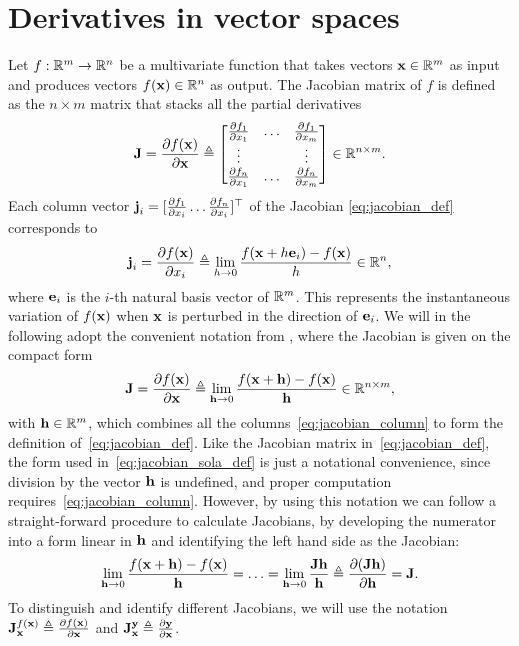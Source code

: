 \section{Derivatives in vector spaces}
Let $f: \bbR^m \to \bbR^n$ be a multivariate function that takes vectors $\vecx \in \bbR^m$ as input and produces vectors $f(\vecx) \in \bbR^n$ as output.
The Jacobian matrix of $f$ is defined as the $n \times m$ matrix that stacks all the partial derivatives
%
\begin{equation} \label{eq:jacobian_def}
  \matJ = \dpar{f(\vecx)}{\vecx} \triangleq
  \begin{bmatrix}
    \dpar{f_1}{x_1} & \hdots & \dpar{f_1}{x_m}\\
    \vdots & & \vdots\\
    \dpar{f_n}{x_1} & \hdots & \dpar{f_n}{x_m}
  \end{bmatrix}
  \in \bbR^{n \times m}.
\end{equation}
%
Each column vector $\vecj_i = [\dpar{f_1}{x_i} \hdots \dpar{f_n}{x_i}]\trans$ of the Jacobian \eqref{eq:jacobian_def} corresponds to
%
\begin{equation} \label{eq:jacobian_column}
  \vecj_i = \dpar{f(\vecx)}{x_i} \triangleq \lim_{h \to 0} \frac{f(\vecx + h \vece_i) - f(\vecx)}{h} \in \bbR^n,
\end{equation}
%
where $\vece_i$ is the $i$-th natural basis vector of $\bbR^m$.
This represents the instantaneous variation of $f(\vecx)$ when $\vecx$ is perturbed in the direction of $\vece_i$.
We will in the following adopt the convenient notation from \cite{SolaARobotics}, where the Jacobian is given on the compact form
%
\begin{equation}  \label{eq:jacobian_sola_def}
  \matJ = \dpar{f(\vecx)}{\vecx} \triangleq
  \lim_{\vech \to 0} \frac{f(\vecx + \vech) - f(\vecx)}{\vech} \in \bbR^{n \times m},
\end{equation}
%
with $\vech \in \bbR^m$, which combines all the columns~\eqref{eq:jacobian_column} to form the definition of~\eqref{eq:jacobian_def}.
Like the Jacobian matrix in~\eqref{eq:jacobian_def}, the form used in~\eqref{eq:jacobian_sola_def} is just a notational convenience, since division by the vector $\vech$ is undefined, and proper computation requires~\eqref{eq:jacobian_column}.
However, by using this notation we can follow a straight-forward procedure to calculate Jacobians, by developing the numerator into a form linear in $\vech$ and identifying the left hand side as the Jacobian:
%
\begin{equation}  \label{eq:computing_jacobian}
  \lim_{\vech \to 0} \frac{f(\vecx + \vech) - f(\vecx)}{\vech} = \hdots =
  \lim_{\vech \to 0} \frac{\matJ \vech}{\vech} \triangleq \dpar{(\matJ \vech)}{\vech} = \matJ.
\end{equation}
%
To distinguish and identify different Jacobians, we will use the notation $\jac{f(\vecx)}{\vecx} \triangleq \dpar{f(\vecx)}{\vecx}$ and $\jac{\vecy}{\vecx} \triangleq \dpar{\vecy}{\vecx}$.

